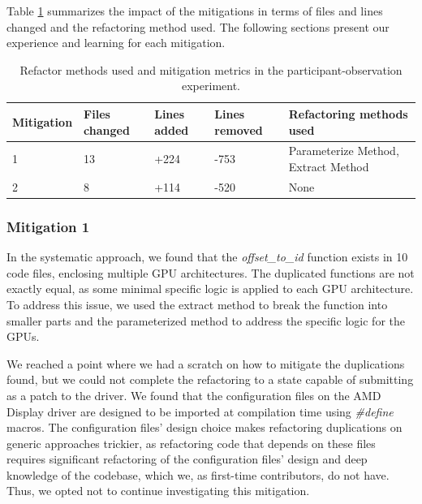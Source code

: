 \documentclass[12pt]{article}
\begin{document}
Table \ref{tab:patch} summarizes the impact of the mitigations in terms of 
files and lines changed and the refactoring method used. The following sections present our experience and learning for each mitigation.

\begin{table}
\centering
\caption{Refactor methods used and mitigation metrics in the participant-observation experiment.}
\begin{tabular}{ | m{20mm} | m{15mm} | m{15mm} | m{15mm} | m{40mm} | }

\hline

\textbf{Mitigation} & \textbf{Files changed} & \textbf{Lines added} & \textbf{Lines removed} & \textbf{Refactoring methods used}
\\ \hline 

1 & 13 & +224 & -753 & Parameterize Method, Extract Method  \\ \hline
2 & 8 & +114 & -520 & None \\ \hline

\hline
\end{tabular}

\label{tab:patch}
\end{table}

\subsubsection{Mitigation 1}

In the systematic approach, we found that the \textit{offset\_to\_id} function 
exists in 10 code files, enclosing multiple GPU architectures. The duplicated 
functions are not exactly equal, as some minimal specific logic is applied to each GPU architecture. To address this issue, we used the extract method to 
break the function into smaller parts and the parameterized method to address 
the specific logic for the GPUs.

We reached a point where we had a scratch on how to mitigate the duplications found, but we could not complete the refactoring to a state capable of submitting as a patch to the driver. We found that the configuration files on the AMD Display driver are designed to be imported at compilation time using \textit{\#define} macros. The configuration files' design choice makes refactoring duplications on generic approaches trickier, as refactoring code that depends on these files requires significant refactoring of the configuration files' design and deep knowledge of the codebase, which we, as first-time contributors, do not have. Thus, we opted not to continue investigating this mitigation.
\end{document}
